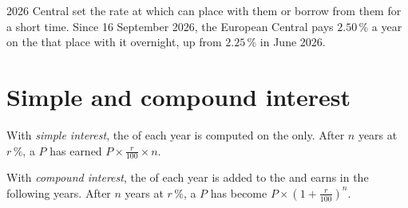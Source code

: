 \begin{dated}{2026}
Central  set the rate at which  can place  with them or borrow from them for a short
time. Since 16 September 2026, the European Central  pays $2.50\,\%$ a year on the  that
 place with it overnight, up from $2.25\,\%$ in June 2026.
\end{dated}

\section{Simple and compound interest}

\begin{definition}\label{def:g8:banks-saving-interest:simple-interest}
With \emph{simple interest}, the  of each year is computed on the
 only. After $n$ years at $r\,\%$, a  $P$ has earned $P \times \frac{r}{100} \times
n$.
\end{definition}

\begin{definition}\label{def:g8:banks-saving-interest:compound-interest}
With \emph{compound interest}, the  of each year is added to the
 and earns  in the following years. After $n$ years at $r\,\%$, a  $P$ has
become $P \times \left(1 + \frac{r}{100}\right)^{n}$.
\end{definition}

